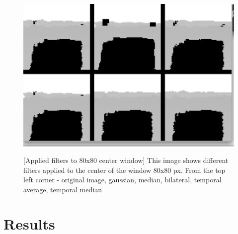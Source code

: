 \documentclass[11pt]{article}
\begin{document}
\begin{figure}[ht]
  \centering
  \includegraphics[width=1\textwidth]{figures/applied_filters_center.png}
  
  [Applied filters to 80x80 center window]{\label{fig:filterswindow} This image shows different filters applied to the center of the window 80x80 px. From the top left corner - original image, gaussian, median, bilateral, temporal average, temporal median}
\end{figure}

\section{Results}


\end{document}
